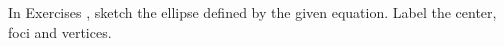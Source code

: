 {\noindent In Exercises}
{, sketch the ellipse defined by the given equation. Label the center, foci and vertices.
}
